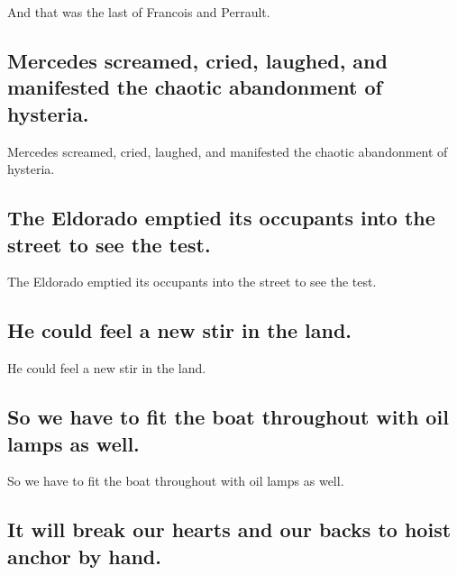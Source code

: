 \documentclass[]{article}
\begin{document}
And that was the last of Francois and Perrault.

\hypertarget{mercedes-screamed-cried-laughed-and-manifested-the-chaotic-abandonment-of-hysteria.}{%
\subsection{Mercedes screamed, cried, laughed, and manifested the
chaotic abandonment of
hysteria.}\label{mercedes-screamed-cried-laughed-and-manifested-the-chaotic-abandonment-of-hysteria.}}

Mercedes screamed, cried, laughed, and manifested the chaotic
abandonment of hysteria.

\hypertarget{the-eldorado-emptied-its-occupants-into-the-street-to-see-the-test.}{%
\subsection{The Eldorado emptied its occupants into the street to see
the
test.}\label{the-eldorado-emptied-its-occupants-into-the-street-to-see-the-test.}}

The Eldorado emptied its occupants into the street to see the test.

\hypertarget{he-could-feel-a-new-stir-in-the-land.}{%
\subsection{He could feel a new stir in the
land.}\label{he-could-feel-a-new-stir-in-the-land.}}

He could feel a new stir in the land.

\hypertarget{so-we-have-to-fit-the-boat-throughout-with-oil-lamps-as-well.}{%
\subsection{So we have to fit the boat throughout with oil lamps as
well.}\label{so-we-have-to-fit-the-boat-throughout-with-oil-lamps-as-well.}}

So we have to fit the boat throughout with oil lamps as well.

\hypertarget{it-will-break-our-hearts-and-our-backs-to-hoist-anchor-by-hand.}{%
\subsection{It will break our hearts and our backs to hoist anchor by
hand.}\label{it-will-break-our-hearts-and-our-backs-to-hoist-anchor-by-hand.}}
\end{document}
